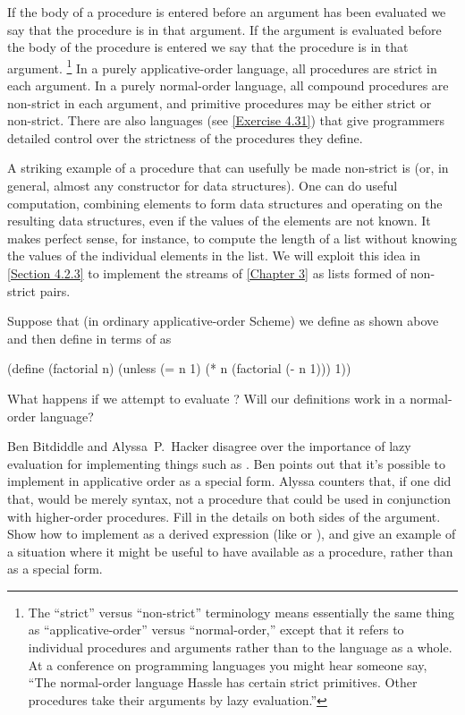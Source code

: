 If the body of a procedure is entered before an argument has been evaluated we say that the procedure is  in that argument.
If the argument is evaluated before the body of the procedure is entered we say that the procedure is  in that argument.%
\footnote{
	The “strict” versus “non-strict” terminology means essentially the same thing as “applicative-order” versus “normal-order,” except that it refers to individual procedures and arguments rather than to the language as a whole.
	At a conference on programming languages you might hear someone say, “The normal-order language Hassle has certain strict primitives.
	Other procedures take their arguments by lazy evaluation.”
}
In a purely applicative-order language, all procedures are strict in each argument.
In a purely normal-order language, all compound procedures are non-strict in each argument, and primitive procedures may be either strict or non-strict.
There are also languages (see \cref{Exercise 4.31}) that give programmers detailed control over the strictness of the procedures they define.

A striking example of a procedure that can usefully be made non-strict is  (or, in general, almost any constructor for data structures).
One can do useful computation, combining elements to form data structures and operating on the resulting data structures, even if the values of the elements are not known.
It makes perfect sense, for instance, to compute the length of a list without knowing the values of the individual elements in the list.
We will exploit this idea in \cref{Section 4.2.3} to implement the streams of \cref{Chapter 3} as lists formed of non-strict  pairs.



\begin{exercise}
	\label{Exercise 4.25}
	Suppose that (in ordinary applicative-order Scheme) we define  as shown above and then define  in terms of  as
	\begin{scheme}
	  (define (factorial n)
	    (unless (= n 1)
	            (* n (factorial (- n 1)))
	            1))
	\end{scheme}
	What happens if we attempt to evaluate ?
	Will our definitions work in a normal-order language?
\end{exercise}



\begin{exercise}
	\label{Exercise 4.26}
	Ben Bitdiddle and Alyssa P. Hacker disagree over the importance of lazy evaluation for implementing things such as .
	Ben points out that it’s possible to implement  in applicative order as a special form.
	Alyssa counters that, if one did that,  would be merely syntax, not a procedure that could be used in conjunction with higher-order procedures.
	Fill in the details on both sides of the argument.
	Show how to implement  as a derived expression (like  or ), and give an example of a situation where it might be useful to have  available as a procedure, rather than as a special form.
\end{exercise}
